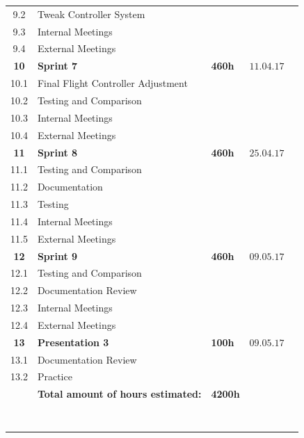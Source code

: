 \begin{center}
\begin{tabular}{cllll}
9.2     & Tweak Controller System &  & \\
9.3       & Internal Meetings      &    & 
\\\rowcolor{gainsboro}
9.4       & External Meetings      &    & \\
\textbf{10} & \textbf{Sprint 7}     & \textbf{460h}     & $11.04.17$ \\
\rowcolor{gainsboro}
10.1     & Final Flight Controller Adjustment &  & \\
10.2     & Testing and Comparison & & 
\\\rowcolor{gainsboro}
10.3       & Internal Meetings      &    & \\
10.4       & External Meetings      &    & 
\\\rowcolor{gainsboro}
\rowcolor{gainsboro}
\textbf{11} & \textbf{Sprint 8}     & \textbf{460h}    & $25.04.17$ \\
11.1     & Testing and Comparison              &  &  \\\rowcolor{gainsboro}
11.2     & Documentation &  &  \\
11.3     & Testing & &  \\\rowcolor{gainsboro}
11.4       & Internal Meetings      &    & \\
11.5       & External Meetings      &    & 
\\\rowcolor{gainsboro}
\rowcolor{gainsboro}
\textbf{12} & \textbf{Sprint 9}     & \textbf{460h}     & $09.05.17$ \\
12.1     & Testing and Comparison &  &  \\\rowcolor{gainsboro}
12.2     & Documentation Review &  & \\
12.3       & Internal Meetings      &    & 
\\\rowcolor{gainsboro}
12.4       & External Meetings      &    & \\
\textbf{13} & \textbf{Presentation 3}     & \textbf{100h}     & $09.05.17$ \\
\rowcolor{gainsboro}
13.1     & Documentation Review &  & \\
13.2     & Practice & & \\
\rowcolor{gainsboro}
         & \textbf{Total amount of hours estimated:} & \textbf{4200h} & 
         \\\\\\\\\
\end{tabular}                                                               
\end{center}

